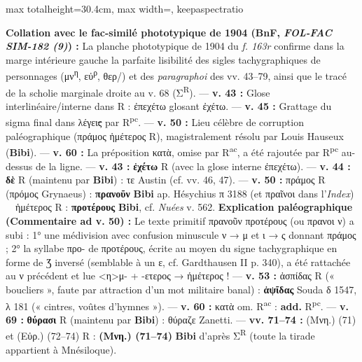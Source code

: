 \documentclass[11pt,twoside]{book}
\newcommand{\currHeadLE}{ΑΡΙΣΤΟΦΑΝΟΥΣ ΘΕΣΜΟΦΟΡΙΑΖΟΥΣΑΙ · SCHOLIES ({\policeGr Σ}\expo{R}) \& GLOSES DU CODEX RAVENNAS 429}
\newcommand{\currHeadRE}{Atlas \& Édition Folio par Folio (ff. 162v–177r)}
\newcommand{\italique}[1]{\textit{#1}}
\newcommand{\auDessus}[2]{\leavevmode\vbox{\offinterlineskip\ialign{\hfil##\hfil\cr\fontsize{5.5pt}{6pt}\selectfont #2\cr\noalign{\kern0.1ex}#1\cr}}}
\newcommand{\inRas}[2]{\if\relax\detokenize{#2}\relax\sout{#1}\else\auDessus{\sout{#1}}{#2}\fi}
\newcommand{\expo}[1]{\textsuperscript{#1}}
\newcommand{\Rpc}{R\expo{pc}}
\newcommand{\Rac}{R\expo{ac}}
\newcommand{\lecon}[1]{\textbf{#1}}
\newcommand{\espApp}{\ {\color{ruleGold}{\policeFr ∥}}\ }
\begin{document}
\begin{adjustbox}{max totalheight=30.4cm, max width=\textwidth, keepaspectratio}
\begin{minipage}{\textwidth}
{ \textbf{Collation avec le fac-similé phototypique de 1904 (BnF, \textit{FOL-FAC SIM-182 (9)}) :} La planche phototypique de 1904 du \textit{f. 163r} confirme dans la marge intérieure gauche la parfaite lisibilité des sigles tachygraphiques de personnages ({\policeGr μν}\expo{{\policeGr η}}, {\policeGr εὐ}\expo{{\policeGr ρ}}, θερ/) et des \textit{paragraphoi} des vv. 43–79, ainsi que le tracé de la scholie marginale droite au v. 68 ({\policeGr Σ}\expo{R}). --- \textbf{v. 43 :} Glose interlinéaire/interne dans R : ἐπεχέτω glosant ἐχέτω. --- \textbf{v. 45 :} Grattage du sigma final dans λέγει\inRas{ς}{} par \Rpc{}. --- \textbf{v. 50 :} Lieu célèbre de corruption paléographique (πράμος ἡμέτερος R), magistralement résolu par Louis Hauseux (\textbf{Bibi}). --- \textbf{v. 60 :} La préposition κατὰ, omise par \Rac{}, a été rajoutée par \Rpc{} au-dessus de la ligne. --- \textbf{v. 43 :} \lecon{ἐχέτω} R (avec la glose interne ἐπεχέτω). --- \textbf{v. 44 :} \lecon{δὲ} R (maintenu par \textbf{Bibi}) : τε Austin (cf. vv. 46, 47). --- \textbf{v. 50 :} πράμος R (πρόμος Grynaeus) : \lecon{πρανοῦν} \lecon{Bibi} ap. Hésychius π 3188 (et πραῖνοι dans l'\italique{Index}) \espApp ἡμέτερος R : \lecon{προτέρους} \lecon{Bibi}, cf. \italique{Nuées} v. 562. \textbf{Explication paléographique (Commentaire ad v. 50) :} Le texte primitif πρανοῦν προτέρους (ou πρανοι ν) a subi : 1° une médivision avec confusion minuscule ν → μ et ι → ς donnant πράμος ; 2° la syllabe προ- de προτέρους, écrite au moyen du signe tachygraphique en forme de Ʒ inversé (semblable à un ε, cf. Gardthausen II p. 340), a été rattachée au ν précédent et lue <η>μ- + -ετερος {\policeFr →} ἡμέτερος ! --- \textbf{v. 53 :} ἀσπίδας R (« boucliers », faute par attraction d'un mot militaire banal) : \lecon{ἁψῖδας} Souda δ 1547, λ 181 (« cintres, voûtes d'hymnes »). --- \textbf{v. 60 :} κατὰ om. \Rac{} : \textbf{add.} \Rpc{}. --- \textbf{v. 69 :} \lecon{θύρασι} R (maintenu par \textbf{Bibi}) : θύραζε Zanetti. --- \textbf{vv. 71–74 :} (Μνη.) (71) et (Εὐρ.) (72–74) R : \lecon{(Μνη.) (71–74)} \lecon{Bibi} d'après {\policeGr Σ}\expo{R} (toute la tirade appartient à Mnésiloque).\par}
\end{minipage}\end{adjustbox}
\newpage
\renewcommand{\currHeadLE}{SCHOLIES MARGINALES ({\policeGr Σ}\expo{R}) \& GLOSES INTERLINÉAIRES · FOLIO 02/30}
\renewcommand{\currHeadRE}{f. 163r (Classense 165r) · vv. 43–79 · {\policeGr Σ} 022 à {\policeGr Σ} 038}
\end{document}
